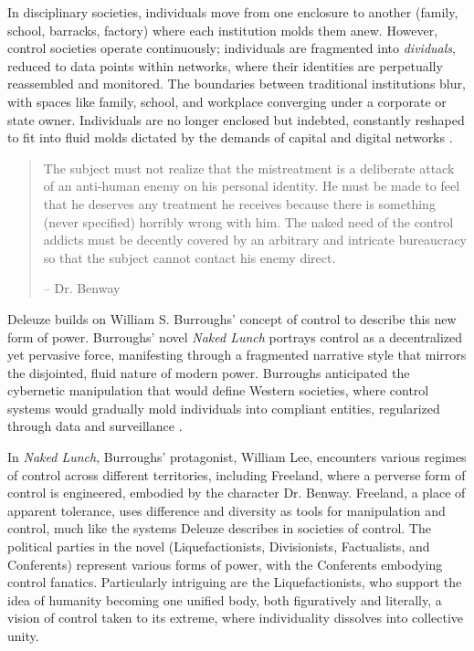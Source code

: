 In disciplinary societies, individuals move from one enclosure to another (family, school, barracks, factory) where each institution molds them anew. However, control societies operate continuously; individuals are fragmented into \textit{dividuals}, reduced to data points within networks, where their identities are perpetually reassembled and monitored. The boundaries between traditional institutions blur, with spaces like family, school, and workplace converging under a corporate or state owner. Individuals are no longer enclosed but indebted, constantly reshaped to fit into fluid molds dictated by the demands of capital and digital networks \parencite[see 5]{deleuze1992a}.

\begin{quote} The subject must not realize that the mistreatment is a deliberate attack of an anti-human enemy on his personal identity. He must be made to feel that he deserves any treatment he receives because there is something (never specified) horribly wrong with him. The naked need of the control addicts must be decently covered by an arbitrary and intricate bureaucracy so that the subject cannot contact his enemy direct.

-- Dr. Benway \parencite[17]{burroughs1992} \end{quote}

Deleuze builds on William S. Burroughs’ concept of control to describe this new form of power. Burroughs’ novel \textit{Naked Lunch} \parencite*{burroughs1992} portrays control as a decentralized yet pervasive force, manifesting through a fragmented narrative style that mirrors the disjointed, fluid nature of modern power. Burroughs anticipated the cybernetic manipulation that would define Western societies, where control systems would gradually mold individuals into compliant entities, regularized through data and surveillance \parencite[see 18]{capitalism2018}.

In \textit{Naked Lunch}, Burroughs’ protagonist, William Lee, encounters various regimes of control across different territories, including Freeland, where a perverse form of control is engineered, embodied by the character Dr. Benway. Freeland, a place of apparent tolerance, uses difference and diversity as tools for manipulation and control, much like the systems Deleuze describes in societies of control. The political parties in the novel (Liquefactionists, Divisionists, Factualists, and Conferents) represent various forms of power, with the Conferents embodying control fanatics. Particularly intriguing are the Liquefactionists, who support the idea of humanity becoming one unified body, both figuratively and literally, a vision of control taken to its extreme, where individuality dissolves into collective unity. 


